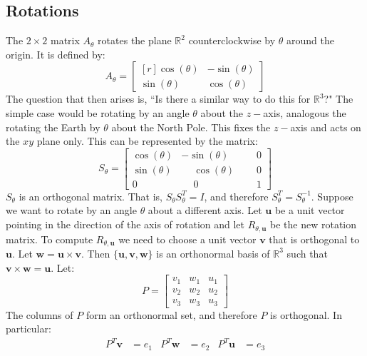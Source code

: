 \documentclass[oneside]{book}
\theoremstyle{mystyle}
\begin{document}
\subsection{Rotations}
The $2\times 2$ matrix $A_{\theta}$ rotates the plane $\mathbb{R}^2$ counterclockwise by $\theta$ around the origin. It is defined by:
\begin{equation*}
    A_{\theta}=\begin{bmatrix*}[r]\cos(\theta) & -\sin(\theta) \\ \sin(\theta) & \cos(\theta)\end{bmatrix*}
\end{equation*}
The question that then arises is, ``Is there a similar way to do this for $\mathbb{R}^3$?" The simple case would be rotating by an angle $\theta$ about the $z-$axis, analogous the rotating the Earth by $\theta$ about the North Pole. This fixes the $z-$axis and acts on the $xy$ plane only. This can be represented by the matrix:
\begin{equation*}
 S_{\theta} = \begin{bmatrix*} \cos(\theta) & -\sin(\theta) & \phantom{sin}0 \\ \sin(\theta) & \phantom{-}\cos(\theta) & \phantom{sin}0\\ 0 & \phantom{-}0 & \phantom{sin}1 \end{bmatrix*}   
\end{equation*}
$S_{\theta}$ is an orthogonal matrix. That is, $S_{\theta} S_{\theta}^T = I$, and therefore $S_{\theta}^T = S_{\theta}^{-1}$. Suppose we want to rotate by an angle $\theta$ about a different axis. Let $\mathbf{u}$ be a unit vector pointing in the direction of the axis of rotation and let $R_{\theta,\mathbf{u}}$ be the new rotation matrix. To compute $R_{\theta,\mathbf{u}}$ we need to choose a unit vector $\mathbf{v}$ that is orthogonal to $\mathbf{u}$. Let $\mathbf{w} = \mathbf{u}\times \mathbf{v}$. Then $\{\mathbf{u},\mathbf{v},\mathbf{w}\}$ is an orthonormal basis of $\mathbb{R}^3$ such that $\mathbf{v}\times \mathbf{w} = \mathbf{u}$. Let:
\begin{equation*}
    P = \begin{bmatrix} v_1 & w_1 & u_1 \\ v_2 & w_2 & u_2 \\ v_3 & w_3 & u_3 \end{bmatrix}
\end{equation*}
The columns of $P$ form an orthonormal set, and therefore $P$ is orthogonal. In particular:
\begin{align*}
    P^{T}\mathbf{v} &= e_{1} & P^{T}\mathbf{w} &= e_{2} & P^{T}\mathbf{u} &= e_{3}
\end{align*}
\end{document}
